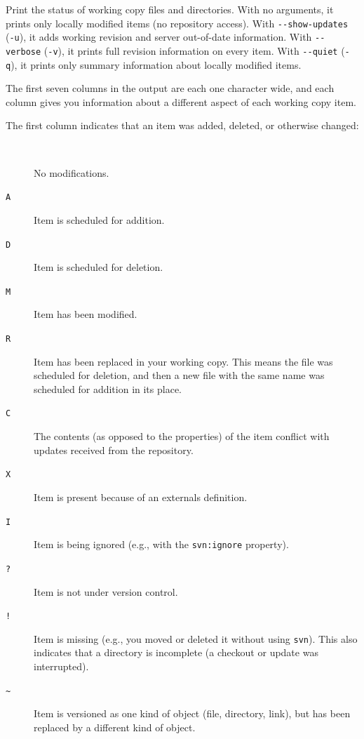 Print the status of working copy files and directories. With no
arguments, it prints only locally modified items (no repository access).
With \texttt{-\/-show-updates} (\texttt{-u}), it adds working revision
and server out-of-date information. With \texttt{-\/-verbose}
(\texttt{-v}), it prints full revision information on every item. With
\texttt{-\/-quiet} (\texttt{-q}), it prints only summary information
about locally modified items.

The first seven columns in the output are each one character wide, and
each column gives you information about a different aspect of each
working copy item.

The first column indicates that an item was added, deleted, or otherwise
changed:

\begin{description}
\item[\texttt{\textquotesingle{}\ \textquotesingle{}}]
No modifications.
\item[\texttt{\textquotesingle{}A\textquotesingle{}}]
Item is scheduled for addition.
\item[\texttt{\textquotesingle{}D\textquotesingle{}}]
Item is scheduled for deletion.
\item[\texttt{\textquotesingle{}M\textquotesingle{}}]
Item has been modified.
\item[\texttt{\textquotesingle{}R\textquotesingle{}}]
Item has been replaced in your working copy. This means the file was
scheduled for deletion, and then a new file with the same name was
scheduled for addition in its place.
\item[\texttt{\textquotesingle{}C\textquotesingle{}}]
The contents (as opposed to the properties) of the item conflict with
updates received from the repository.
\item[\texttt{\textquotesingle{}X\textquotesingle{}}]
Item is present because of an externals definition.
\item[\texttt{\textquotesingle{}I\textquotesingle{}}]
Item is being ignored (e.g., with the \texttt{svn:ignore} property).
\item[\texttt{\textquotesingle{}?\textquotesingle{}}]
Item is not under version control.
\item[\texttt{\textquotesingle{}!\textquotesingle{}}]
Item is missing (e.g., you moved or deleted it without using
\texttt{svn}). This also indicates that a directory is incomplete (a
checkout or update was interrupted).
\item[\texttt{\textquotesingle{}\textasciitilde{}\textquotesingle{}}]
Item is versioned as one kind of object (file, directory, link), but has
been replaced by a different kind of object.
\end{description}

